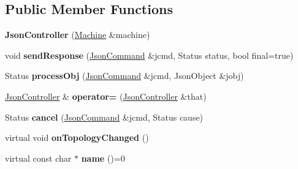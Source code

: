\subsection*{Public Member Functions}
\begin{DoxyCompactItemize}
\item 
\hypertarget{classfirestep_1_1_json_controller_aa99c033aaa8cd12b4ca02eb095309cba}{{\bfseries Json\+Controller} (\hyperlink{classfirestep_1_1_machine}{Machine} \&machine)}\label{classfirestep_1_1_json_controller_aa99c033aaa8cd12b4ca02eb095309cba}

\item 
\hypertarget{classfirestep_1_1_json_controller_ab896ca30795d53a2b1dbb4f6512bcab4}{void {\bfseries send\+Response} (\hyperlink{classfirestep_1_1_json_command}{Json\+Command} \&jcmd, Status status, bool final=true)}\label{classfirestep_1_1_json_controller_ab896ca30795d53a2b1dbb4f6512bcab4}

\item 
\hypertarget{classfirestep_1_1_json_controller_a81ace494431cde7ddeaf6b2004f389b5}{Status {\bfseries process\+Obj} (\hyperlink{classfirestep_1_1_json_command}{Json\+Command} \&jcmd, Json\+Object \&jobj)}\label{classfirestep_1_1_json_controller_a81ace494431cde7ddeaf6b2004f389b5}

\item 
\hypertarget{classfirestep_1_1_json_controller_ae07fb11355da2ca9b32623ed1265718a}{\hyperlink{classfirestep_1_1_json_controller}{Json\+Controller} \& {\bfseries operator=} (\hyperlink{classfirestep_1_1_json_controller}{Json\+Controller} \&that)}\label{classfirestep_1_1_json_controller_ae07fb11355da2ca9b32623ed1265718a}

\item 
\hypertarget{classfirestep_1_1_json_controller_a0a117c0ce47f5c0304b5aa0153077ee1}{Status {\bfseries cancel} (\hyperlink{classfirestep_1_1_json_command}{Json\+Command} \&jcmd, Status cause)}\label{classfirestep_1_1_json_controller_a0a117c0ce47f5c0304b5aa0153077ee1}

\item 
\hypertarget{classfirestep_1_1_json_controller_a51e5351248ad28d3c40c9befd49d879a}{virtual void {\bfseries on\+Topology\+Changed} ()}\label{classfirestep_1_1_json_controller_a51e5351248ad28d3c40c9befd49d879a}

\item 
\hypertarget{classfirestep_1_1_json_controller_a86a2069cce59a7465db39587a912025f}{virtual const char $\ast$ {\bfseries name} ()=0}\label{classfirestep_1_1_json_controller_a86a2069cce59a7465db39587a912025f}

\end{DoxyCompactItemize}
